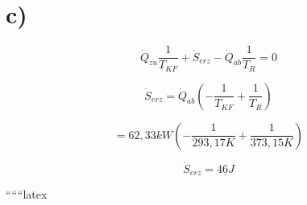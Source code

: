 

\section*{c)}

\[
\dot{Q}_{zu} \frac{1}{T_{KF}} + \dot{S}_{erz} - \dot{Q}_{ab} \frac{1}{T_R} = 0
\]

\[
\dot{S}_{erz} = \dot{Q}_{ab} \left( -\frac{1}{T_{KF}} + \frac{1}{T_R} \right)
\]

\[
= 62,33 kW \left( -\frac{1}{293,17 K} + \frac{1}{373,15 K} \right)
\]

\[
\dot{S}_{erz} = \underline{46 J}
\]

``````latex